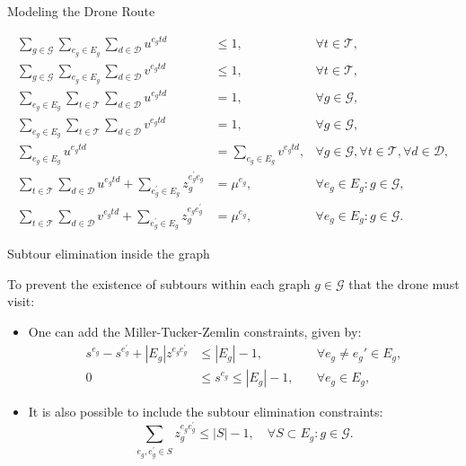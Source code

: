 \documentclass[slidestop,usepdftitle=false,10pt]{beamer}
\begin{document}
	\begin{frame}{Modeling the Drone Route}
	\begin{small}
    {\color{red}
    \begin{align}
        \sum_{g\in \mathcal G}\sum_{e_g\in E_g} \sum_{d\in\mathcal D} u^{e_gtd} & \leq 1, &\forall t\in \mathcal T, \label{st:DEntd}\\%
        \sum_{g\in\mathcal G}\sum_{e_g\in E_g} \sum_{d\in\mathcal D} v^{e_gtd} & \leq 1, &\forall t\in \mathcal T, \label{st:DExtd}\\%
        \sum_{e_g\in E_g} \sum_{t\in \mathcal T} \sum_{d\in\mathcal D} u^{e_gtd} & = 1, &\forall g\in\mathcal G, \label{st:DEngd}\\%
        \sum_{e_g\in E_g} \sum_{t\in \mathcal T} \sum_{d\in\mathcal D} v^{e_gtd} & = 1, &\forall g\in\mathcal G, \label{st:DExgd}\\%
        \sum_{e_g\in E_g} u^{e_gtd} & = \sum_{e_g\in E_g} v^{e_gtd}, &\forall g\in\mathcal G, \forall t\in \mathcal T, \forall d\in\mathcal D, \label{st:Duvd}\\%
         \sum_{t\in \mathcal T} \sum_{d \in \mathcal D} u^{e_gtd} + \sum_{e^\prime_g\in E_g} z_g^{e^\prime_ge_g} & = \mu^{e_g}, &\forall e_g\in E_g:g\in\mathcal G, \label{st:DInud}\\
         \sum_{t\in \mathcal T} \sum_{d \in \mathcal D} v^{e_gtd} + \sum_{e^\prime_g\in E_g} z_g^{e_ge^\prime_g} & = \mu^{e_g}, &\forall e_g\in E_g:g\in\mathcal G. \label{st:DInvd}
    \end{align}}
    \end{small}
	\end{frame}
	
	\begin{frame}{Subtour elimination inside the graph}
	    \begin{small}
		To prevent the existence of subtours within each graph $g\in \mathcal G$ that the drone must visit: 
		\begin{itemize}
		\item One can add the Miller-Tucker-Zemlin constraints, given by:
    		\begin{align}
    		    s^{e_g} - s^{e^\prime_g} + |E_g|z^{e_ge^\prime_g} & \leq |E_g| - 1  , &\quad\forall e_g \neq e_g'\in E_g \tag{MTZ$_1$}, \label{MTZ1}\\
                0 & \leq s^{e_g} \leq |E_g| - 1, &\quad\forall e_g\in E_g\tag{MTZ$_2$},\label{MTZ2}
                \end{align}
        \item It is also possible to include the subtour elimination constraints:
        \begin{equation}\tag{SEC}\label{SEC}
        \sum_{e_g, e^\prime_g \in S} z_g^{e_ge^\prime_g} \leq |S| - 1, \quad \forall S\subset E_g:g\in \mathcal G.
    \end{equation}
    \end{itemize}
    \end{small}
	    
	\end{frame}
	
\end{document}
